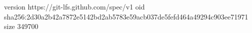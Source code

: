 version https://git-lfs.github.com/spec/v1
oid sha256:2d30a2b42a7872e5142bd2ab5783e59acb037de5fefd464a49294c903ee71971
size 349700
